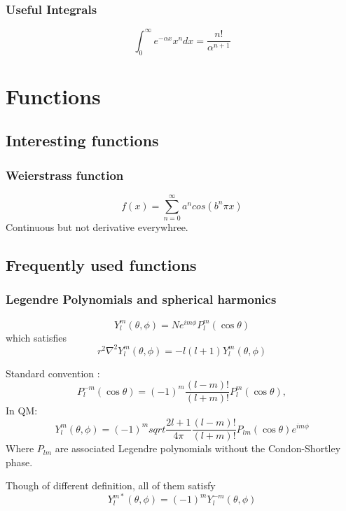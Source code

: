 \subsubsection{Useful Integrals}
\[
    \int_0^\infty e^{-\alpha x}x^ndx = \frac{n!}{\alpha^{n+1}} 
    \]
\section{Functions}

\subsection{Interesting functions}
\subsubsection{Weierstrass function}
\begin{equation}
    f(x) = \sum_{n=0}^{\infty}a^{n}cos(b^{n}\pi x)
\end{equation}
Continuous but not derivative everywhree.


\subsection{Frequently used functions}

\subsubsection{Legendre Polynomials and spherical harmonics}
\begin{equation}
    Y^m_l(\theta,\phi)=Ne^{im\phi}P^m_l(\cos\theta)
\end{equation}
which satisfies
\[
    r^2\nabla^2Y^m_l(\theta,\phi)=-l(l+1)Y^m_l(\theta,\phi)
    \]

Standard convention :
\[
    P^{-m}_l(\cos\theta)=(-1)^m\frac{(l-m)!}{(l+m)!}P^m_l(\cos\theta),
\]
In QM:
\[
    Y^m_l(\theta,\phi)=(-1)^msqrt{\frac{2l+1}{4\pi}\frac{(l-m)!}{(l+m)!}}P_{lm}(\cos\theta)e^{im\phi}
\]
Where $P_{lm}$ are associated Legendre polynomials without the
Condon-Shortley phase.

Though of different definition, all of them satisfy
\[ 
    Y_l^{m*}(\theta,\phi)=(-1)^{m}Y_{l}^{-m}(\theta,\phi) 
    \]


